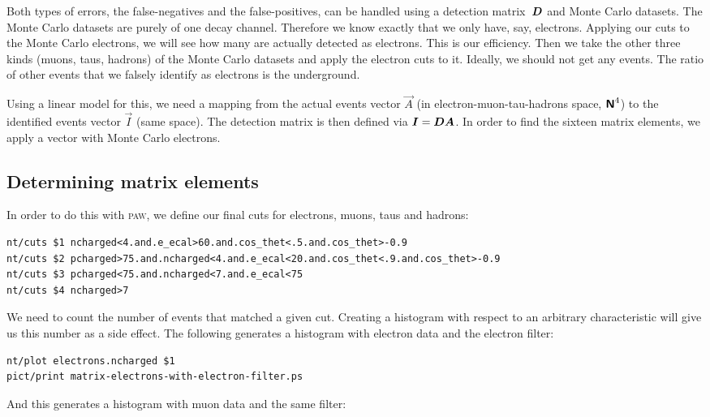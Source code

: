 \documentclass[11pt, english, fleqn, DIV=15, headinclude, BCOR=2cm]{scrreprt}
\begin{document}
Both types of errors, the false-negatives and the false-positives, can be
handled using a detection matrix~$\mat D$ and Monte Carlo datasets.
The Monte Carlo datasets are purely of one decay channel. Therefore we know
exactly that we only have, say, electrons. Applying our cuts to the Monte Carlo
electrons, we will see how many are actually detected as electrons. This is our
efficiency. Then we take the other three kinds (muons, taus, hadrons) of the
Monte Carlo datasets and apply the electron cuts to it. Ideally, we should not
get any events. The ratio of other events that we falsely identify as electrons
is the underground.

Using a linear model for this, we need a mapping from the actual events vector
$\vec A$ (in electron-muon-tau-hadrons space, $\text{\bfseries\sffamily{N}}^4$) to the identified events
vector $\vec I$ (same space). The detection matrix is then defined via $\vec I
= \mat D \vec A$. In order to find the sixteen matrix elements, we apply a
vector with Monte Carlo electrons.


\subsection{Determining matrix elements}

In order to do this with \textsc{paw}, we define our final cuts for electrons,
muons, taus and hadrons:

\begin{lstlisting}
nt/cuts $1 ncharged<4.and.e_ecal>60.and.cos_thet<.5.and.cos_thet>-0.9
nt/cuts $2 pcharged>75.and.ncharged<4.and.e_ecal<20.and.cos_thet<.9.and.cos_thet>-0.9
nt/cuts $3 pcharged<75.and.ncharged<7.and.e_ecal<75
nt/cuts $4 ncharged>7
\end{lstlisting}

We need to count the number of events that matched a given cut. Creating a
histogram with respect to an arbitrary characteristic will give us this number
as a side effect. The following generates a histogram with electron data and
the electron filter:

\begin{lstlisting}
nt/plot electrons.ncharged $1
pict/print matrix-electrons-with-electron-filter.ps
\end{lstlisting}

And this generates a histogram with muon data and the same filter:
\end{document}
